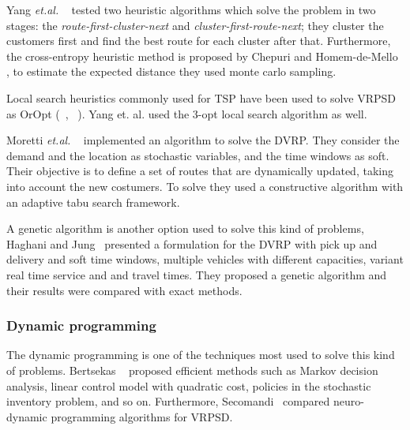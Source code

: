 Yang \textit{et.al.} ~\cite{yang_stochastic_2000} tested two heuristic algorithms which solve the problem in two stages: the \textit{route-first-cluster-next} and \textit{cluster-first-route-next}; they cluster the customers  first and find the best route for each cluster after that. Furthermore, the cross-entropy heuristic method is proposed by Chepuri and Homem-de-Mello \cite{Chepuri}, to estimate the expected distance they used monte carlo sampling.

Local search heuristics commonly used for TSP have been used to solve VRPSD as OrOpt (~\cite{yang_stochastic_2000}, ~\cite{bianchi_hybrid_2006}). Yang et. al. used the 3-opt local search algorithm as well.

Moretti \textit{et.al.} ~\cite{Moretti} implemented an algorithm to solve the DVRP. They consider the demand and the location as stochastic variables, and the time windows as soft. Their objective is to define a set of routes that are dynamically updated, taking into account the new costumers. To solve they used a constructive algorithm with an adaptive tabu search framework.

A genetic algorithm is another option used to solve this kind of problems, Haghani and Jung~\cite{haghani_dynamic_2005} presented a formulation for the DVRP with pick up and delivery and soft time windows,  multiple vehicles with different capacities, variant real time service and and travel times. They proposed a genetic algorithm and their results were compared with exact methods.

\subsubsection{Dynamic programming}


The dynamic programming is one of the techniques most used to solve this kind of problems. Bertsekas ~\cite{Bertsekas} proposed efficient methods such as Markov decision analysis, linear control model with quadratic cost, policies in the stochastic inventory problem, and so on. Furthermore, Secomandi~\cite{secomandi_comparing_2000} compared neuro-dynamic programming algorithms for VRPSD.


